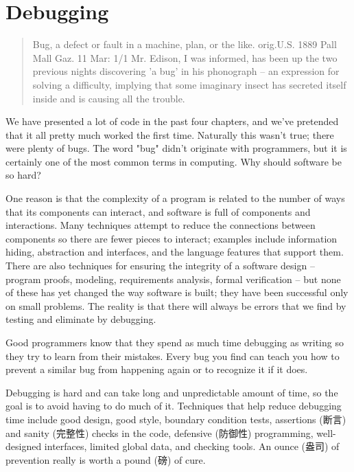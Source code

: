 \chapter{Debugging}
\label{chap:debug}
\begin{quote}
    Bug, a defect or fault in a machine, plan, or the like. orig.U.S. 1889
    Pall Mall Gaz. 11 Mar: 1/1 Mr. Edison, I was informed, has been up the
    two previous nights discovering 'a bug' in his phonograph -- an
    expression for solving a difficulty, implying that some imaginary insect
    has secreted itself inside and is causing all the trouble.
\end{quote}

\begin{quotesrc}
\end{quotesrc}

We have presented a lot of code in the past four chapters, and we've
pretended that it all pretty much worked the first time. Naturally this
wasn't true; there were plenty of bugs. The word "bug" didn't originate
with programmers, but it is certainly one of the most common terms in
computing. Why should software be so hard?

One reason is that the complexity of a program is related to the number of
ways that its components can interact, and software is full of components
and interactions. Many techniques attempt to reduce the connections between
components so there are fewer pieces to interact; examples include
information hiding, abstraction and interfaces, and the language features
that support them. There are also techniques for ensuring the integrity of
a software design -- program proofs, modeling, requirements analysis,
formal verification -- but none of these has yet changed the way software
is built; they have been successful only on small problems. The reality is
that there will always be errors that we find by testing and eliminate by
debugging.

Good programmers know that they spend as much time debugging as writing so
they try to learn from their mistakes. Every bug you find can teach you how
to prevent a similar bug from happening again or to recognize it if it
does.

Debugging is hard and can take long and unpredictable amount of time, so
the goal is to avoid having to do much of it. Techniques that help reduce
debugging time include good design, good style, boundary condition tests,
assertions (断言) and sanity (完整性) checks in the code, defensive
(防御性) programming, well-designed interfaces, limited global data, and
checking tools. An ounce (盎司) of prevention really is worth a pound (磅)
of cure.

